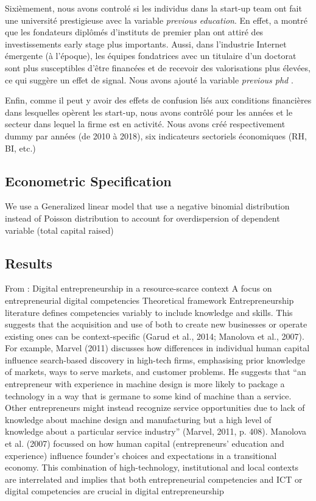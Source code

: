 \documentclass[12pt]{article}
\begin{document}
Sixièmement, nous avons controlé si les individus dans la start-up team ont fait une université prestigieuse avec la variable \textit{previous education}. En effet, \citet{ratzinger2018impact} a montré que les fondateurs diplômés d'instituts de premier plan ont attiré des investissements early stage plus importants. Aussi, dans l'industrie Internet émergente (à l'époque), les équipes fondatrices avec un titulaire d'un doctorat sont plus susceptibles d'être financées et de recevoir des valorisations plus élevées, ce qui suggère un effet de signal. Nous avons ajouté la variable \textit{previous phd} \citep{hsu2007experienced}.

Enfin, comme il peut y avoir des effets de confusion liés aux conditions financières dans lesquelles opèrent les start-up, nous avons contrôlé pour les années et le secteur dans lequel la firme est en activité. Nous avons créé respectivement dummy par années (de 2010 à 2018), six indicateurs sectoriels économiques (RH, BI, etc.)

\subsection{Econometric Specification}

We use a Generalized linear model that use a negative binomial distribution instead of Poisson distribution to account for overdispersion of dependent variable (total capital raised)


\subsection{Results}










From : Digital entrepreneurship in a resource-scarce context A focus on entrepreneurial digital competencies
Theoretical framework Entrepreneurship literature defines competencies variably to include knowledge and skills. This suggests that the acquisition and use of both to create new businesses or operate existing ones can be context-specific (Garud et al., 2014; Manolova et al., 2007). For example, Marvel (2011) discusses how differences in individual human capital influence search-based discovery in high-tech firms, emphasising prior knowledge of markets, ways to serve markets, and customer problems. He suggests that “an entrepreneur with experience in machine design is more likely to package a technology in a way that is germane to some kind of machine than a service. Other entrepreneurs might instead recognize service opportunities due to lack of knowledge about machine design and manufacturing but a high level of knowledge about a particular service industry” (Marvel, 2011, p. 408). Manolova et al. (2007) focussed on how human capital (entrepreneurs’ education and experience) influence founder’s choices and expectations in a transitional economy. This combination of high-technology, institutional and local contexts are interrelated and implies that both entrepreneurial competencies and ICT or digital competencies are crucial in digital entrepreneurship
\end{document}
